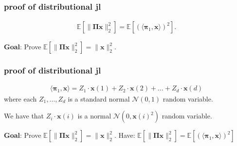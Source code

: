 \documentclass[compress]{beamer}
\newcommand{\bs}[1]{\boldsymbol{#1}}
\newcommand{\bv}[1]{\mathbf{#1}}
\newcommand{\E}{\mathbb{E}}
\begin{document}
\begin{frame}
	\frametitle{proof of distributional jl}
	\begin{align*}
		\E\left[\|\bs{\Pi} \bv{x} \|_2^2 \right]  = \E\left[\left(\langle\bs{\pi}_1,\bv{x}\rangle\right)^2 \right] .
	\end{align*}
	\vspace{9em}
	\begin{block}{\vspace*{-3ex}}
		\small \textbf{Goal}: Prove $\E \left[\|\bs{\Pi} \bv{x} \|_2^2\right] = \|\bv{x}\|_2^2$.
	\end{block}
\end{frame}

\begin{frame}
	\frametitle{proof of distributional jl}	
	\begin{align*}
		\langle\bs{\pi}_1,\bv{x}\rangle = Z_1\cdot\bv{x}(1) + Z_2\cdot\bv{x}(2)  +  \ldots + Z_d\cdot\bv{x}(d)
	\end{align*}
	where each $Z_1, \ldots, Z_d$ is a standard normal $\mathcal{N}(0,1)$ random variable. 
	
	We have that $Z_i \cdot\bv{x}(i)$ is a normal $\mathcal{N}(0,\bv{x}(i)^2)$ random variable.
	
	\vspace{5em}
	\begin{block}{\vspace*{-3ex}}
		\small \textbf{Goal}: Prove $\E \left[\|\bs{\Pi} \bv{x} \|_2^2\right] = \|\bv{x}\|_2^2$. Have: $\E \left[\|\bs{\Pi} \bv{x} \|_2^2\right] = \E\left[\left(\langle\bs{\pi}_1,\bv{x}\rangle\right)^2 \right]$
	\end{block}
\end{frame}
\end{document}
